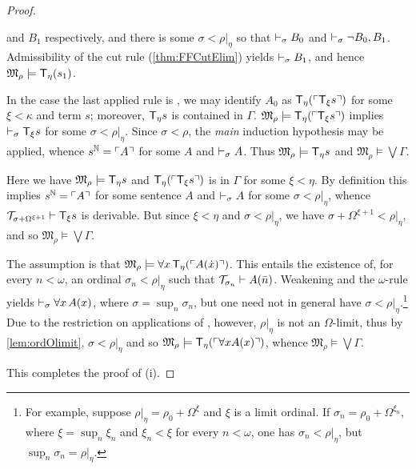 \documentclass[UKenglish,cleveref,DIV=12]{scrartcl}
\theoremstyle{definition}
\theoremstyle{definition}
\begin{document}
\begin{proof}
\begin{description}
  and $B_1$ respectively, and there is some $\sigma<\rho|_\eta$ so
  that $\vdash_\sigma  B_0$ and $\vdash_\sigma \lnot B_0,B_1$.
  Admissibility of the cut rule (\cref{thm:FFCutElim}) yields $\vdash_\sigma  B_1$, and hence
  $\mathfrak{M}_\rho\models \mathsf{T}_\eta(s_1)$.
\item [\normalfont\Del\eta.] In the case the last applied rule is \Del\eta,
  we may identify $A_0$ as $\mathsf{T}_\eta(\ulcorner{\mathsf{T}_\xi s}\urcorner)$ for some $\xi<\kappa$
  and  term $s$; moreover, $\mathsf{T}_\eta s$ is contained in $\Gamma$.
  $\mathfrak{M}_\rho\models \mathsf{T}_\eta(\ulcorner{\mathsf{T}_\xi s}\urcorner)$ implies $\vdash_\sigma 
  \mathsf{T}_\xi s$ for some $\sigma<\rho|_\eta$. Since $\sigma<\rho$, the
  \emph{ main} induction hypothesis may be applied, whence $s^\mathbb N=\ulcorner{A}\urcorner$ for some $A$
  and  $\vdash_\sigma  A$. Thus $\mathfrak{M}_\rho\models \mathsf{T}_\eta s$ and
  $\mathfrak{M}_\rho\models\bigvee\Gamma$.
\item [\normalfont{}\Rep\eta.] Here we have $\mathfrak{M}_\rho\models \mathsf{T}_\eta s$ and
  $\mathsf{T}_\eta(\ulcorner{\mathsf{T}_\xi s}\urcorner)$ is in $\Gamma$ for some $\xi<\eta$. By definition this
  implies $s^\mathbb N=\ulcorner{A}\urcorner$ for some sentence $A$ and $\vdash_\sigma  A$ for some
  $\sigma<\rho|_\eta$, whence $\mathcal{T}_{\sigma+\Omega^{\xi+1}}\vdash \mathsf{T}_\xi s$ is
  derivable. But since $\xi<\eta$ and $\sigma<\rho|_\eta$, we have
  $\sigma+\Omega^{\xi+1}<\rho|_\eta$, and so $\mathfrak{M}_\rho\models \bigvee\Gamma$.
\item [\normalfont{}\Uni\eta.] The assumption is that
  $\mathfrak{M}_\rho\models\forall x\,\mathsf{T}_\eta(\ulcorner{A(\dot x)}\urcorner)$. This entails the
  existence of, for every $n<\omega$, an ordinal $\sigma_n<\rho|_\eta$ such that
  $\mathcal{T}_{\sigma_n}\vdash A(\bar n)$. Weakening and the $\omega$-rule yields
  $\vdash_\sigma  \forall x\,A(x)$, where $\sigma=\sup_n{\sigma_n}$, but
  one need not in general have $\sigma<\rho|_\eta$.\footnote{For example,
  suppose $\rho|_\eta=\rho_0+\Omega^\xi$ and $\xi$ is a limit ordinal. If
  $\sigma_n= \rho_0+\Omega^{\xi_n}$, where $\xi=\sup_n\xi_n$ and
  $\xi_n<\xi$ for every  $n<\omega$, one has $\sigma_n<\rho|_\eta$, but
  $\sup_n\sigma_n=\rho|_\eta$.} Due to the restriction on applications of
  \Uni\eta, however, $\rho|_\eta$ is not an $\Omega$-limit,
  thus by \cref{lem:ordOlimit}, $\sigma<\rho|_\eta$ and so
  $\mathfrak{M}_\rho\models \mathsf{T}_\eta(\ulcorner{\forall xA(x)}\urcorner)$, whence
  $\mathfrak{M}_\rho\models\bigvee\Gamma$.
\end{description}
This completes the proof of (i).


\end{proof}
\end{document}
